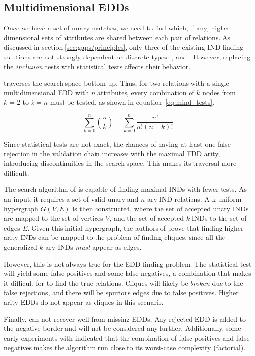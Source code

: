 \subsection{Multidimensional EDDs}
\label{sec:multidimensional_edd}
Once we have a set of unary matches, we need to find which, if any, higher dimensional
sets of attributes are shared between each pair of relations. As discussed in section
\ref{sec:gaps/principles}, only three of the existing \gls{IND} finding solutions are not strongly
dependent on discrete types: \Mind, \Zigzag and \Find.
However, replacing the \emph{inclusion} tests with statistical tests affects their behavior.

\Mind traverses the search space bottom-up. Thus, for two relations with a single
multidimensional \gls{EDD} with $n$ attributes, every combination of $k$ nodes from $k = 2$
to $k = n$ must be tested, as shown in equation~\ref{eq:mind_tests}.

\begin{equation}
    \sum_{k=0}^{n}{\binom{n}{k}} = \sum_{k=0}^{n} \frac{n!}{n!(n - k)!}
    \label{eq:mind_tests}
\end{equation}

Since statistical tests are not exact, the chances of having
at least one false rejection in the validation chain
increases with the maximal \gls{EDD} arity, introducing
discontinuities in the search space. This makes its traversal more difficult.

The search algorithm of \Find is capable of finding
maximal \glspl{IND} with fewer tests. As an input, it requires a set of valid unary and $n$-ary
\gls{IND} relations. A k-uniform hypergraph $G(V,E)$ is then constructed, where the set of accepted
unary \glspl{IND} are mapped to the set of vertices $V$, and the set of accepted $k$-INDs to 
the set of edges $E$. 
Given this initial hypergraph, the authors of \Find prove that finding higher arity \glspl{IND} can be
mapped to the problem of finding cliques, since all the generalized $k$-ary \glspl{IND}
\emph{must} appear as edges.

However, this is not always true for the \gls{EDD} finding problem. The statistical test
will yield some false positives and some false negatives, a combination that makes it
difficult for \Find to find the true relations. Cliques will likely be \emph{broken} due
to the false rejections, and there will be spurious edges due to false positives.
Higher arity \glspl{EDD} do not appear as cliques in this scenario.

Finally, \Zigzag can not recover well from missing
\glspl{EDD}. Any rejected \gls{EDD} is added to the negative border
and will not be considered any further. Additionally, some
early experiments with \Zigzag indicated
that the combination of false positives and false negatives
makes the algorithm run close to its worst-case complexity (factorial).


